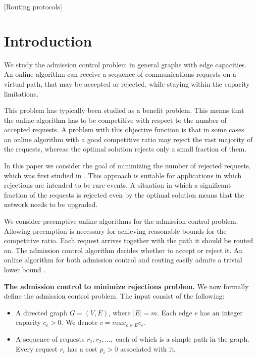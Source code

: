 \documentclass{sig-alternate}
\begin{document}
[Routing protocols] 





\section{Introduction}\label{sec:intro}

We study the admission control problem in general graphs with edge
capacities. An online algorithm can receive a sequence of
communications requests on a virtual path, that may be accepted or
rejected, while staying within the capacity limitations.

This problem has typically been studied as a benefit problem. This
means that the online algorithm has to be competitive with respect
to the number of accepted requests. A problem with this objective
function is that in some cases an online algorithm with a good
competitive ratio may reject the vast majority of the requests,
whereas the optimal solution rejects only a small fraction of
them.

In this paper we consider the goal of minimizing the number of
rejected requests, which was first studied in \cite{BlKaKl01}.
This approach is suitable for applications in which rejections are
intended to be rare events. A situation in which a significant
fraction of the requests is rejected even by the optimal solution
means that the network needs to be upgraded.

We consider preemptive online algorithms for the admission control
problem. Allowing preemption is necessary for achieving reasonable
bounds for the competitive ratio. Each request arrives together
with the path it should be routed on. The admission control
algorithm decides whether to accept or reject it. An online
algorithm for both admission control and routing easily admits a
trivial lower bound \cite{BlKaKl01}.

\textbf{The admission control to minimize rejections problem.} We
now formally define the admission control problem. The input
consist of the following:
\begin{itemize}
    \item A directed graph $G=(V,E)$, where $|E|=m$.
    Each edge $e$ has an integer capacity $c_e>0$.
    We denote $c=max_{e \in E} c_e$.
    \item A sequence of requests $r_1,r_2,\ldots,$ each of which is a simple path in the graph.
    Every request $r_i$ has a cost $p_i>0$ associated with it.
\end{itemize}
\end{document}
